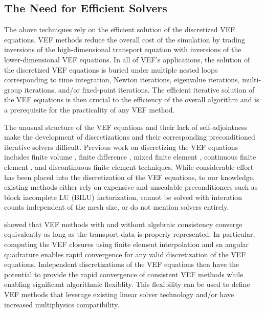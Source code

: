 \documentclass[../doc.tex]{subfiles}
\begin{document}
\subsection{The Need for Efficient Solvers}
The above techniques rely on the efficient solution of the discretized VEF equations. VEF methods reduce the overall cost of the simulation by trading inversions of the high-dimensional transport equation with inversions of the lower-dimensional VEF equations. In all of VEF's applications, the solution of the discretized VEF equations is buried under multiple nested loops corresponding to time integration, Newton iterations, eigenvalue iterations, multi-group iterations, and/or fixed-point iterations. The efficient iterative solution of the VEF equations is then crucial to the efficiency of the overall algorithm and is a prerequisite for the practicality of any VEF method. 

The unusual structure of the VEF equations and their lack of self-adjointness make the development of discretizations and their corresponding preconditioned iterative solvers difficult.
Previous work on discretizing the VEF equations includes finite volume \cite{anistratov_fvm,doi:10.1080/00411459308203810,QDBC,Jiang_2012,Jones2019TheQM}, finite difference \cite{WIESELQUIST2014343}, mixed finite element \cite{vallette,me,olivier_mandc,LOU2019258}, continuous finite element \cite{wieselquist,two-level-independent-warsa}, and discontinuous finite element \cite{dima_dfem} techniques. 
While considerable effort has been placed into the discretization of the VEF equations, to our knowledge, existing methods either rely on expensive and unscalable preconditioners such as block incomplete LU (BILU) factorization, cannot be solved with interation counts independent of the mesh size, or do not mention solvers entirely. 


\textcite{two-level-independent-warsa} showed that VEF methods with and without algebraic consistency converge equivalently as long as the transport data is properly represented. In particular, computing the VEF closures using finite element interpolation and \gls{sn} angular quadrature enables rapid convergence for any valid discretization of the VEF equations. 
Independent discretizations of the VEF equations then have the potential to provide the rapid convergence of consistent VEF methods while enabling significant algorithmic flexiblity. This flexibility can be used to define VEF methods that leverage existing linear solver technology and/or have increased multiphysics compatibility. 
\end{document}
